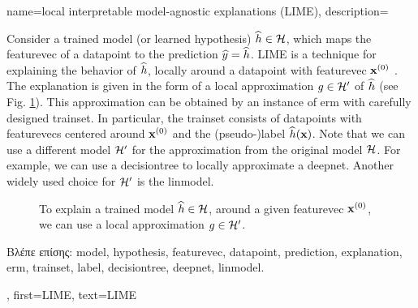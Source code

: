 {name={local interpretable model-agnostic explanations (LIME)},
	description={Consider 
		a trained \gls{model} (or learned \gls{hypothesis}) $\widehat{h} \in \mathcal{H}$, 
		which maps the \gls{featurevec} of a \gls{datapoint} to the \gls{prediction} $\widehat{y}= \widehat{h}$. 
		LIME is a technique for explaining 
		the behavior of $\widehat{h}$, locally around a \gls{datapoint} with \gls{featurevec} ${\bf x}^{(0)}$ \cite{Ribeiro2016}. 
		The \gls{explanation} is given in the form of a local approximation $g \in \mathcal{H}'$ of $\widehat{h}$ (see Fig. \ref{fig_lime_dict}). 
		This approximation can be obtained by an instance of \gls{erm} with carefully designed 
		\gls{trainset}. In particular, the \gls{trainset} consists of \gls{datapoint}s with 
		\gls{featurevec}s centered around ${\bf x}^{(0)}$ and the (pseudo-)\gls{label} $\widehat{h}({\bf x})$. 
		Note that we can use a different \gls{model} $\mathcal{H}'$ for the approximation from 
		the original \gls{model} $\mathcal{H}$. For example, we can use a \gls{decisiontree} 
		to locally approximate a \gls{deepnet}. Another widely used choice for $\mathcal{H}'$ is 
		the \gls{linmodel}. 
		\begin{figure}[H]
		\begin{center}
		\end{center}
		\caption{To explain a trained \gls{model} $\widehat{h} \in \mathcal{H}$, around a 
		given \gls{featurevec} ${\bf x}^{(0)}$, we can use a local approximation $g \in \mathcal{H}'$. }
		\label{fig_lime_dict}
		\end{figure}
		\foreignlanguage{greek}{Βλέπε επίσης:} \gls{model}, \gls{hypothesis}, \gls{featurevec}, \gls{datapoint}, \gls{prediction}, 
		\gls{explanation}, \gls{erm}, \gls{trainset}, \gls{label}, \gls{decisiontree}, \gls{deepnet}, \gls{linmodel}.},
	first={LIME},
	text={LIME}
}
	
